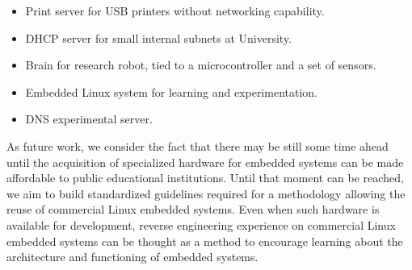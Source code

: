 \documentclass[conference]{IEEEtran}
\newcommand{\nota}[1]{}
\begin{document}
\nota{
\begin{itemize}
\item Como servidor de impresión para impresoras USB sin conexiones de red.
\item Como servidor DHCP en pequeñas redes internas de la Universidad.
\item Como cerebro de un robot experimental, que se comunica con 
un microcontrolador y sensores.
\item Como sistema Linux embebido para aprendizaje y experimentación.
\item Y como un servidor DNS experimental.
\end{itemize}
}

\begin{itemize}
\item Print server for USB printers without networking capability. 
\item DHCP server for small internal subnets at University. 
\item Brain for research robot, tied to a microcontroller and a set of sensors. 
\item Embedded Linux system for learning and experimentation.  
\item DNS experimental server.  
\end{itemize}

\nota{
Como trabajo futuro, se espera repetir la experiencia \cite{gpl}
en futuros sistemas Linux embebidos comerciales, para estandarizar
las tareas necesarias en una metodología, y hasta que la
posibilidad de adquirir hardware especializado para desarrollos
de sistemas Linux embebidos sea mucho mas accesible para
las instituciones publicas. En cuyo caso, la experiencia
de ingeniería inversa se puede mantener sobre productos comerciales,
como una manera de incentivar el aprendizaje del funcionamiento
y la arquitectura de los sistemas embebidos.
}

As future work, we consider the fact that there may be still some time ahead until the acquisition of specialized hardware for embedded systems can be made affordable to public educational institutions. Until that moment can be reached, we aim to build standardized guidelines required for a methodology allowing the reuse of commercial Linux embedded systems. Even when such hardware is available  for development, reverse engineering 
experience on commercial Linux embedded systems can be thought as 
a method to encourage learning about the architecture and functioning of embedded systems. 
\end{document}
